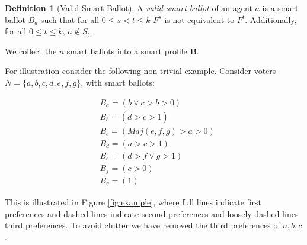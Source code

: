 \documentclass[11pt,a4paper, titlepage]{article}
\theoremstyle{definition}
\newtheorem{definition}[theorem]{Definition}
\newcommand{\Maj}{\mathit{Maj}}
\begin{document}
\begin{definition}[Valid Smart Ballot]
    A \emph{valid smart ballot} of an agent $a$ is a smart ballot $B_a$ such that for all $ 0 \leq s < t \leq k$ $F^s$ is not equivalent to $F^t$. Additionally, for all $0 \leq t \leq k$, $a \notin S_t$.
\end{definition}


We collect the $n$ smart ballots into a smart profile $\mathbf{B}$. 

For illustration consider the following non-trivial example.
Consider voters $N = \{a, b, c, d, e, f, g\}$, with smart ballots:

\begin{align*}
    &B_a =(b \lor c > b > 0) \\
    &B_b = \left(\overline{d} > c > 1 \right) \\
    &B_c = \left(\Maj(e, f, g) > a > 0 \right) \\
    &B_d = (a > c > 1) \\
    &B_e = (d > f \lor g > 1) \\
    &B_f = (c > 0) \\
    &B_g = (1)
\end{align*}

This is illustrated in Figure \ref{fig:example}, where full lines indicate first preferences and dashed lines indicate second preferences and loosely dashed lines third preferences. To avoid clutter we have removed the third preferences of $a, b, c$.
\end{document}
